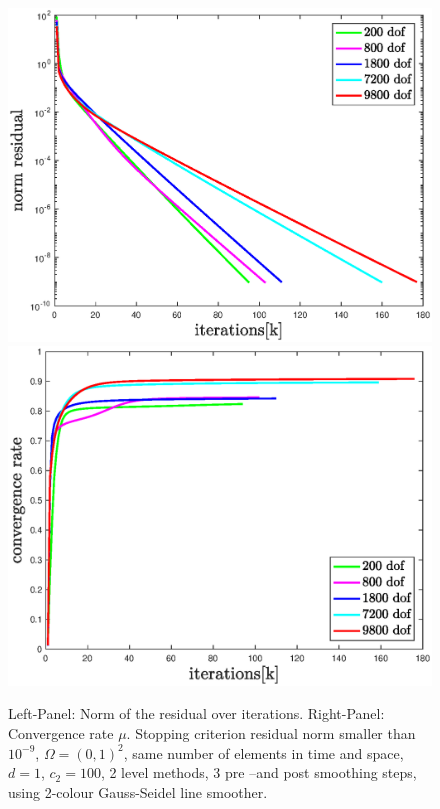 \documentclass[../draft_1.tex]{subfiles}
\begin{document}
\begin{figure}[h!]
	\centering
	\includegraphics[scale=0.4]{images/implementation/multigrid_scaling/norm_res_scaling_mg_line_smoother}
	\includegraphics[scale=0.4]{images/implementation/multigrid_scaling/convergence_rate_scaling_mg_line_smoother}
	\caption{Left-Panel: Norm of the residual over iterations. Right-Panel: Convergence rate $\mu$. Stopping criterion residual norm smaller than $10^{-9}$, $\Omega = (0,1)^2$, same number of elements in time and space, $d = 1$, $c_2 = 100$, 2 level methods, 3 pre --and post smoothing steps, using 2-colour Gauss-Seidel line smoother.}
	\label{fig:scaling_mg_line_smoother}
\end{figure}
\end{document}
